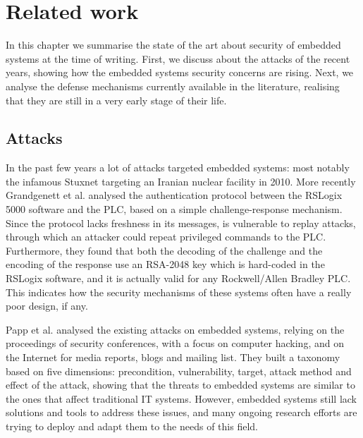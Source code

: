 \chapter{Related work}
\label{chap:related}

In this chapter we summarise the state of the art about security of embedded systems at the time of writing.
First, we discuss about the attacks of the recent years, showing how the embedded systems security concerns are rising.
Next, we analyse the defense mechanisms currently available in the literature, realising that they are still in a very early stage of their life.

\section{Attacks}

In the past few years a lot of attacks targeted embedded systems: most notably the infamous Stuxnet \cite{stuxnet} targeting an Iranian nuclear facility in 2010.
More recently Grandgenett et al. \cite{io-command} analysed the authentication protocol between the RSLogix 5000 software and the PLC, based on a simple challenge-response mechanism.
Since the protocol lacks freshness in its messages, is vulnerable to replay attacks, through which an attacker could repeat privileged commands to the PLC.
Furthermore, they found that both the decoding of the challenge and the encoding of the response use an RSA-2048 key which is hard-coded in the RSLogix software,
and it is actually valid for any Rockwell/Allen Bradley PLC.
This indicates how the security mechanisms of these systems often have a really poor design, if any.

Papp et al. \cite{taxonomy} analysed the existing attacks on embedded systems, relying on the proceedings of security conferences, with a focus on computer hacking,
and on the Internet for media reports, blogs and mailing list.
They built a taxonomy based on five dimensions: precondition, vulnerability, target, attack method and effect of the attack,
showing that the threats to embedded systems are similar to the ones that affect traditional IT systems.
However, embedded systems still lack solutions and tools to address these issues, and many ongoing research efforts are trying to deploy and adapt them to the needs of this field.

